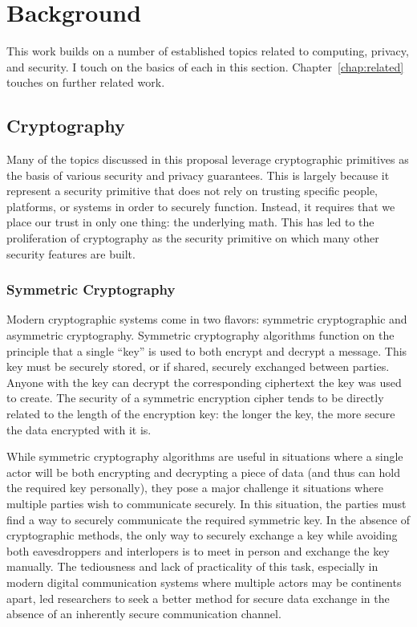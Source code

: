 \chapter{Background}
\label{chap:background}

This work builds on a number of established topics related to
computing, privacy, and security. I touch on the basics of each in
this section. Chapter~\ref{chap:related} touches on further related
work.

\section{Cryptography}
\label{chap:background:crypto}

Many of the topics discussed in this proposal leverage cryptographic
primitives as the basis of various security and privacy
guarantees. This is largely because it represent a security primitive
that does not rely on trusting specific people, platforms, or systems
in order to securely function. Instead, it requires that we place our
trust in only one thing: the underlying math. This has led to the
proliferation of cryptography as the security primitive on which many
other security features are built.

\subsection{Symmetric Cryptography}

Modern cryptographic systems come in two flavors: symmetric
cryptographic and asymmetric cryptography. Symmetric cryptography
algorithms function on the principle that a single ``key'' is used to
both encrypt and decrypt a message. This key must be securely stored,
or if shared, securely exchanged between parties. Anyone with the key
can decrypt the corresponding ciphertext the key was used to
create. The security of a symmetric encryption cipher tends to be
directly related to the length of the encryption key: the longer the
key, the more secure the data encrypted with it is.

While symmetric cryptography algorithms are useful in situations where
a single actor will be both encrypting and decrypting a piece of data
(and thus can hold the required key personally), they pose a major
challenge it situations where multiple parties wish to communicate
securely. In this situation, the parties must find a way to securely
communicate the required symmetric key. In the absence of
cryptographic methods, the only way to securely exchange a key while
avoiding both eavesdroppers and interlopers is to meet in person and
exchange the key manually. The tediousness and lack of practicality of
this task, especially in modern digital communication systems where
multiple actors may be continents apart, led researchers to seek a
better method for secure data exchange in the absence of an inherently
secure communication channel.

